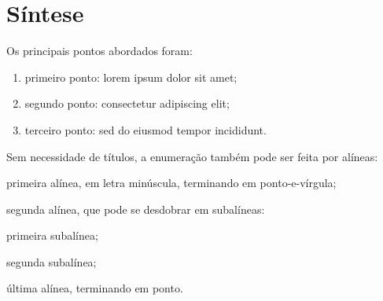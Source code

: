 \section{Síntese}

Os principais pontos abordados foram:

\begin{enumerate}[label=(\roman*)]
  \item primeiro ponto: lorem ipsum dolor sit amet;
  \item segundo ponto: consectetur adipiscing elit;
  \item terceiro ponto: sed do eiusmod tempor incididunt.
\end{enumerate}

Sem necessidade de títulos, a enumeração também pode ser feita por alíneas:

\begin{alineas}
  \item primeira alínea, em letra minúscula, terminando em ponto-e-vírgula;
  \item segunda alínea, que pode se desdobrar em subalíneas:
  \begin{subalineas}
    \item primeira subalínea;
    \item segunda subalínea;
  \end{subalineas}
  \item última alínea, terminando em ponto.
\end{alineas}

